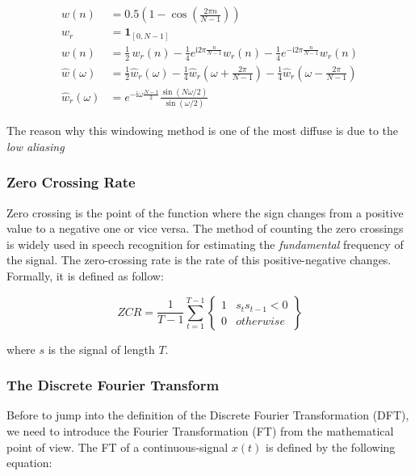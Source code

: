 \begin{subequations}
\label{eq:hann_function_equations}
\begin{align}
w(n) &= 0.5 \left(1 - \cos \left ( \frac{2 \pi n}{N-1} \right) \right) \label{eq:discrete_window_function} \\
w_r &= \mathbf{1}_{[0,N-1]} \label{eq:rectangular_function} \\
w(n) &= \frac{1}{2} \,w_r(n) -\frac{1}{4} e^{\mathrm{i}2\pi \frac{n}{N-1}} w_r(n) - \frac{1}{4}e^{-\mathrm{i}2\pi \frac{n}{N-1}} w_r(n) \label{eq:euler_formula} \\
\hat{w} (\omega) &= \frac{1}{2} \hat{w}_r (\omega) - \frac{1}{4} \hat{w}_r \left(\omega + \frac{2\pi}{N-1}\right) - \frac{1}{4} \hat{w}_r \left(\omega - \frac{2\pi}{N-1}\right) \label{eq:spectrum_ft} \\
\hat{w}_r (\omega) &= e^{-\mathrm{i} \omega \frac{N-1}{2}} \frac{\sin(N\omega/2)}{\sin(\omega/2)} \label{eq:final_hann}
\end{align}
\end{subequations}

\noindent The reason why this windowing method is one of the most diffuse is due to the \textit{low aliasing}

\subsubsection{Zero Crossing Rate}
\label{ssubs:Zero Crossing Rate}
Zero crossing is the point of the function where the sign changes from a positive value to a negative one or vice versa. The method of counting the zero crossings is widely used in speech recognition for estimating the \textit{fundamental} frequency of the signal. The zero-crossing rate is the rate of this positive-negative changes. Formally, it is defined as follow:

\begin{equation}
ZCR = \frac{1}{T-1} \sum_{t=1}^{T-1} \begin{Bmatrix}
										1  & s_t s_{t-1} < 0 \\ 
										0 & otherwise
									 \end{Bmatrix}
\end{equation}

\noindent where $s$ is the signal of length $T$.

\subsubsection{The Discrete Fourier Transform}
\label{ssubs:discrete_fourier_transform}
Before to jump into the definition of the Discrete Fourier Transformation (DFT), we need to introduce the Fourier Transformation (FT) from the mathematical point of view. The FT of a continuous-signal $x(t)$ is defined by the following equation:

